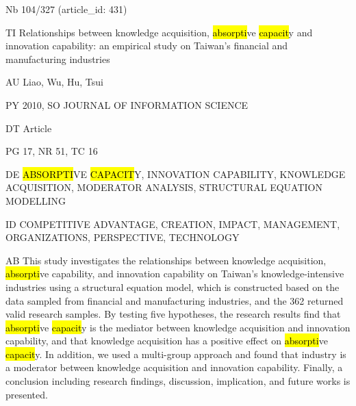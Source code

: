 \documentclass[a4paper]{article}
\begin{document}
\vspace*{-2cm}
Nb \tabto{0cm}104/327 (article\_id: 431)\par
TI \tabto{0cm}Relationships between knowledge acquisition, \hl{absorpti}ve \hl{capacit}y and innovation capability: an empirical study on Taiwan's financial and manufacturing industries\par
AU \tabto{0cm}Liao, Wu, Hu, Tsui\par
PY \tabto{0cm}2010, SO JOURNAL OF INFORMATION SCIENCE\par
DT \tabto{0cm}Article\par
PG \tabto{0cm}17, NR 51, TC 16\par
DE \tabto{0cm}\hl{ABSORPTI}VE \hl{CAPACIT}Y, INNOVATION CAPABILITY, KNOWLEDGE ACQUISITION, MODERATOR ANALYSIS, STRUCTURAL EQUATION MODELLING\par
ID \tabto{0cm}COMPETITIVE ADVANTAGE, CREATION, IMPACT, MANAGEMENT, ORGANIZATIONS, PERSPECTIVE, TECHNOLOGY\par
AB \tabto{0cm}This study investigates the relationships between knowledge acquisition, \hl{absorpti}ve capability, and innovation capability on Taiwan's knowledge-intensive industries using a structural equation model, which is constructed based on the data sampled from financial and manufacturing industries, and the 362 returned valid research samples. By testing five hypotheses, the research results find that \hl{absorpti}ve \hl{capacit}y is the mediator between knowledge acquisition and innovation capability, and that knowledge acquisition has a positive effect on \hl{absorpti}ve \hl{capacit}y. In addition, we used a multi-group approach and found that industry is a moderator between knowledge acquisition and innovation capability. Finally, a conclusion including research findings, discussion, implication, and future works is presented.\par
\clearpage
\end{document}
